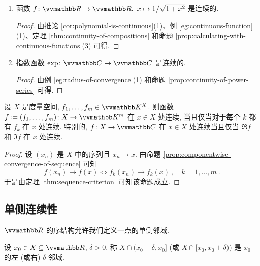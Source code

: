\begin{example}
\begin{enumerate}
\begin{proof}
\[            \]
            不难验证 \(f\) 是连续的, \(g\) 在 \(0\) 处不连续. 而 \(f \circ g = \id_I\) 和 \(g \circ f = \id_Z\) 都是连续的.
        \end{proof}
        \item 函数 \(f \colon \R \to \R,\ x \mapsto 1 \big/ \sqrt{1 + x^2}\) 是连续的.
        \begin{proof}
            由推论 \ref{cor:polynomial-is-continuous}(1)、例 \ref{eg:continuous-function}(1)、定理 \ref{thm:continuity-of-compositions} 和命题 \ref{prop:calculating-with-continuous-functions}(3) 可得.
        \end{proof}
        \item 指数函数 \(\exp \colon \C \to \C\) 是连续的.
        \begin{proof}
            由例 \ref{eg:radius-of-convergence}(1) 和命题 \ref{prop:continuity-of-power-series} 可得.
        \end{proof}
    \end{enumerate}
\end{example}

\begin{proposition}
    设 \(X\) 是度量空间, \(f_1, \ldots, f_m \in \K^X\). 则函数 \(f \coloneqq (f_1, \ldots, f_m) \colon X \to \K^m\) 在 \(x \in X\) 处连续, 当且仅当对于每个 \(k\) 都有 \(f_k\) 在 \(x\) 处连续. 特别的, \(f \colon X \to \C\) 在 \(x \in X\) 处连续当且仅当 \(\Re f\) 和 \(\Im f\) 在 \(x\) 处连续.
\end{proposition}

\begin{proof}
    设 \((x_n)\) 是 \(X\) 中的序列且 \(x_n \to x\). 由命题 \ref{prop:componentwise-convergence-of-sequence} 可知
    \[
        f(x_n) \to f(x) \iff f_k(x_n) \to f_k(x)\ ,\quad k = 1, \ldots, m\ .
    \]
    于是由定理 \ref{thm:sequence-criterion} 可知该命题成立.
\end{proof}

\subsection{单侧连续性}

\(\R\) 的序结构允许我们定义一点的单侧邻域.

\begin{definition}[单侧邻域]
    设 \(x_0 \in X \subseteq \R\), \(\delta > 0\). 称 \(X \cap (x_0 - \delta, x_0]\) (或 \(X \cap [x_0, x_0 + \delta)\)) 是 \(x_0\) 的左 (或右) \(\delta\)-邻域.
\end{definition}

